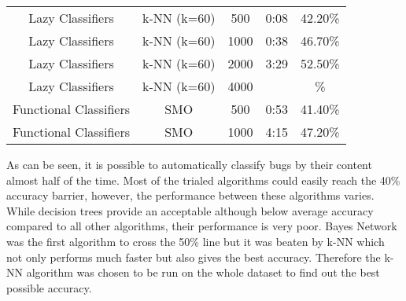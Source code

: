 \begin{tabular}{|c|c|c|c|c|}
Lazy Classifiers & k-NN (k=60) &   500  &   0:08  &    42.20\%  \\
Lazy Classifiers & k-NN (k=60) &  1000  &   0:38  &    46.70\%  \\
Lazy Classifiers & k-NN (k=60) &  2000  &   3:29  &    52.50\%  \\
Lazy Classifiers & k-NN (k=60) &  4000  &     &    \%  \\

Functional Classifiers & SMO &   500  &  0:53  &    41.40\%  \\
Functional Classifiers & SMO &  1000  &  4:15  &    47.20\%  \\

\hline
\end{tabular}

As can be seen, it is possible to automatically classify bugs by their content almost half of the time. Most of the trialed algorithms could easily reach the 40\% accuracy barrier, however, the performance between these algorithms varies. While decision trees provide an acceptable although below average accuracy compared to all other algorithms, their performance is very poor. Bayes Network was the first algorithm to cross the 50\% line but it was beaten by k-NN which not only performs much faster but also gives the best accuracy. Therefore the k-NN algorithm was chosen to be run on the whole dataset to find out the best possible accuracy.



